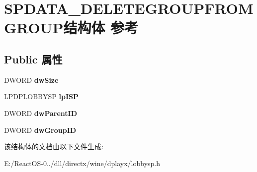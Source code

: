 \hypertarget{struct_s_p_d_a_t_a___d_e_l_e_t_e_g_r_o_u_p_f_r_o_m_g_r_o_u_p}{}\section{S\+P\+D\+A\+T\+A\+\_\+\+D\+E\+L\+E\+T\+E\+G\+R\+O\+U\+P\+F\+R\+O\+M\+G\+R\+O\+U\+P结构体 参考}
\label{struct_s_p_d_a_t_a___d_e_l_e_t_e_g_r_o_u_p_f_r_o_m_g_r_o_u_p}
\subsection*{Public 属性}
\begin{DoxyCompactItemize}
\item 
\mbox{\label{struct_s_p_d_a_t_a___d_e_l_e_t_e_g_r_o_u_p_f_r_o_m_g_r_o_u_p_aef3b4535dbe90279725b34e66bd4a972}} 
D\+W\+O\+RD {\bfseries dw\+Size}
\item 
\mbox{\label{struct_s_p_d_a_t_a___d_e_l_e_t_e_g_r_o_u_p_f_r_o_m_g_r_o_u_p_a6a1d3eaa5599ac3796553b9186f4e4cb}} 
L\+P\+D\+P\+L\+O\+B\+B\+Y\+SP {\bfseries lp\+I\+SP}
\item 
\mbox{\label{struct_s_p_d_a_t_a___d_e_l_e_t_e_g_r_o_u_p_f_r_o_m_g_r_o_u_p_abf79cbda199dcb2a2e8c05285c315665}} 
D\+W\+O\+RD {\bfseries dw\+Parent\+ID}
\item 
\mbox{\label{struct_s_p_d_a_t_a___d_e_l_e_t_e_g_r_o_u_p_f_r_o_m_g_r_o_u_p_a1bc6cf6dfc27ebab15a01ca7d2bc9539}} 
D\+W\+O\+RD {\bfseries dw\+Group\+ID}
\end{DoxyCompactItemize}


该结构体的文档由以下文件生成\+:\begin{DoxyCompactItemize}
\item 
E\+:/\+React\+O\+S-\/0../dll/directx/wine/dplayx/lobbysp.\+h\end{DoxyCompactItemize}
